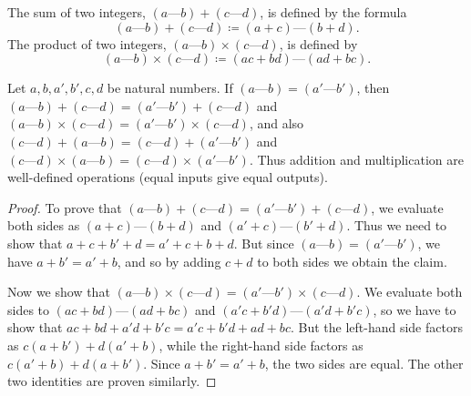\begin{definition}\label{4.1.2}
    The sum of two integers, \((a \text{---} b) + (c \text{---} d)\), is defined by the formula
    \[
        (a \text{---} b) + (c \text{---} d) \coloneqq (a + c) \text{---} (b + d).
    \]
    The product of two integers, \((a \text{---} b) \times (c \text{---} d)\), is defined by
    \[
        (a \text{---} b) \times (c \text{---} d) \coloneqq (ac + bd) \text{---} (ad + bc).
    \]
\end{definition}

\begin{lemma}\label{4.1.3}
    Let \(a, b, a', b', c, d\) be natural numbers.
    If \((a \text{---} b) = (a' \text{---} b')\), then \((a \text{---} b) + (c \text{---} d) = (a' \text{---} b') + (c \text{---} d)\) and \((a \text{---} b) \times (c \text{---} d) = (a' \text{---} b') \times (c \text{---} d)\), and also \((c \text{---} d) + (a \text{---} b) = (c \text{---} d) + (a' \text{---} b')\) and \((c \text{---} d) \times (a \text{---} b) = (c \text{---} d) \times (a' \text{---} b')\).
    Thus addition and multiplication are well-defined operations (equal inputs give equal outputs).
\end{lemma}

\begin{proof}
    To prove that \((a \text{---} b) + (c \text{---} d) = (a' \text{---} b') + (c \text{---} d)\), we evaluate both sides as \((a + c) \text{---} (b + d)\) and \((a' + c) \text{---} (b' + d)\).
    Thus we need to show that \(a + c + b' + d = a' + c + b + d\).
    But since \((a \text{---} b) = (a' \text{---} b')\), we have \(a + b' = a' + b\), and so by adding \(c + d\) to both sides we obtain the claim.

    Now we show that \((a \text{---} b) \times (c \text{---} d) = (a' \text{---} b') \times (c \text{---} d)\).
    We evaluate both sides to \((ac + bd) \text{---} (ad + bc)\) and \((a'c + b'd) \text{---} (a'd + b'c)\), so we have to show that \(ac + bd + a'd + b'c = a'c + b'd + ad + bc\).
    But the left-hand side factors as \(c(a + b') + d(a' + b)\), while the right-hand side factors as \(c(a' + b) + d(a + b')\).
    Since \(a + b' = a' + b\), the two sides are equal.
    The other two identities are proven similarly.
\end{proof}

